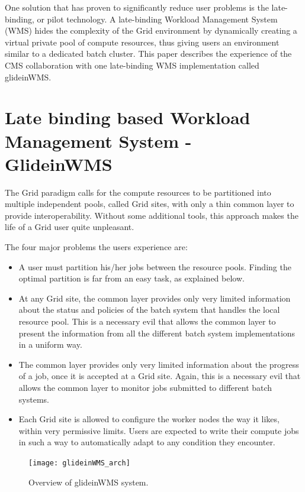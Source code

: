 \documentclass[a4paper]{jpconf}
\begin{document}
One solution that has proven to significantly reduce user problems is the late-binding, or pilot technology.  
A late-binding Workload Management System (WMS) hides the complexity of the Grid environment by dynamically creating 
a virtual private pool of compute resources, thus giving users an environment similar to a dedicated batch cluster.
This paper describes the experience of the CMS collaboration with one late-binding WMS implementation called glideinWMS. 
\section{Late binding based Workload Management System - GlideinWMS }
The Grid paradigm calls for the compute resources to be partitioned into multiple independent pools, called Grid sites,
with only a thin common layer to provide interoperability.
Without some additional tools, this approach makes the life of a Grid user quite unpleasant. 

The four major problems the users experience are:
\begin {itemize}
\item 
A user must partition his/her jobs between the resource pools.
Finding the optimal partition is far from an easy task, as explained below.
\item
At any Grid site, the common layer provides only very limited information about the status and policies of the
batch system that handles the local resource pool.
This is a necessary evil that allows the common layer to present the information from all the different batch system 
implementations in a uniform way. 
\item 
The common layer provides only very limited information about the progress of a job, once it is accepted at a Grid site.
Again, this is a necessary evil that allows the common layer to monitor jobs submitted to different batch systems.  
\item
Each Grid site is allowed to configure the worker nodes the way it likes, within very permissive limits.
Users are expected to write their compute jobs in such a way to automatically adapt to any condition they encounter.
\end{itemize}
\begin{figure}
\begin{center}
\texttt{[image: glideinWMS\_arch]}
\end{center}
\caption{Overview of glideinWMS system.}
\label{fig:glideinWMS}
\end{figure}
\end{document}
